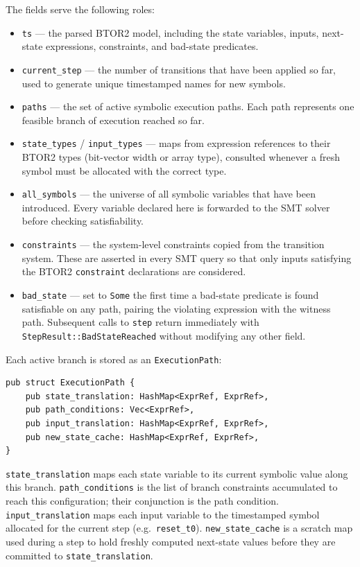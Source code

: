 \documentclass[11pt]{article}
\begin{document}
\noindent The fields serve the following roles:
\begin{itemize}
    \item \texttt{ts} — the parsed BTOR2 model, including the state variables, inputs, next-state expressions, constraints, and bad-state predicates.
    \item \texttt{current\_step} — the number of transitions that have been applied so far, used to generate unique timestamped names for new symbols.
    \item \texttt{paths} — the set of active symbolic execution paths. Each path represents one feasible branch of execution reached so far.
    \item \texttt{state\_types} / \texttt{input\_types} — maps from expression references to their BTOR2 types (bit-vector width or array type), consulted whenever a fresh symbol must be allocated with the correct type.
    \item \texttt{all\_symbols} — the universe of all symbolic variables that have been introduced. Every variable declared here is forwarded to the SMT solver before checking satisfiability.
    \item \texttt{constraints} — the system-level constraints copied from the transition system. These are asserted in every SMT query so that only inputs satisfying the BTOR2 \texttt{constraint} declarations are considered.
    \item \texttt{bad\_state} — set to \texttt{Some} the first time a bad-state predicate is found satisfiable on any path, pairing the violating expression with the witness path. Subsequent calls to \texttt{step} return immediately with \texttt{StepResult::BadStateReached} without modifying any other field.
\end{itemize}

Each active branch is stored as an \texttt{ExecutionPath}:

\begin{center}
\begin{verbatim}
pub struct ExecutionPath {
    pub state_translation: HashMap<ExprRef, ExprRef>,
    pub path_conditions: Vec<ExprRef>,
    pub input_translation: HashMap<ExprRef, ExprRef>,
    pub new_state_cache: HashMap<ExprRef, ExprRef>,
}
\end{verbatim}
\end{center}

\noindent \texttt{state\_translation} maps each state variable to its current symbolic value along this branch. \texttt{path\_conditions} is the list of branch constraints accumulated to reach this configuration; their conjunction is the path condition. \texttt{input\_translation} maps each input variable to the timestamped symbol allocated for the current step (e.g.\ \texttt{reset\_t0}). \texttt{new\_state\_cache} is a scratch map used during a step to hold freshly computed next-state values before they are committed to \texttt{state\_translation}.
\end{document}
